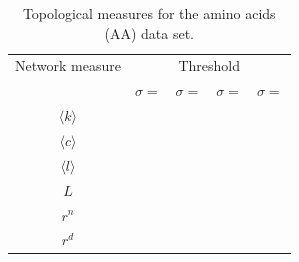\documentclass[12pt]{article}
\begin{document}
\begin{table}[!ht]
 \begin{center}
 \caption{\footnotesize Topological measures for the amino acids (AA) data set.}
  \begin{tabular}{ccccc}
\toprule
  Network measure & \multicolumn{4}{c}{Threshold}\\
 & $\sigma=$& $\sigma=$& $\sigma=$&$\sigma=$\\
 \midrule
$\langle k \rangle$ &     &          &          & \\
$\langle c \rangle$ &     &          &          & \\
$\langle l \rangle$ &     &          &          & \\ %
  $L$ &     &          &          & \\ %
$r^{n}$ &   &          &          & \\ %
$r^{d}$ &   &          &          & \\ %
\bottomrule
  \end{tabular}
 \end{center}
 \label{tab:indAA}
\end{table}
\end{document}
